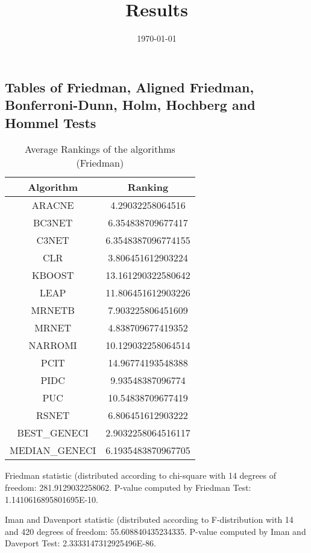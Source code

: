 \documentclass[a4paper,10pt]{article}
\title{Results}
\author{}
\date{\today}
\begin{document}
\begin{landscape}
\oddsidemargin 0in \topmargin 0in\maketitle
\section{Tables of Friedman, Aligned Friedman, Bonferroni-Dunn, Holm, Hochberg and Hommel Tests}
\begin{table}[!htp]
\centering
\caption{Average Rankings of the algorithms (Friedman)
}\begin{tabular}{c|c}
Algorithm&Ranking\\
\hline
ARACNE&4.29032258064516\\
BC3NET&6.354838709677417\\
C3NET&6.3548387096774155\\
CLR&3.806451612903224\\
KBOOST&13.161290322580642\\
LEAP&11.806451612903226\\
MRNETB&7.903225806451609\\
MRNET&4.838709677419352\\
NARROMI&10.129032258064514\\
PCIT&14.96774193548388\\
PIDC&9.93548387096774\\
PUC&10.54838709677419\\
RSNET&6.806451612903222\\
BEST_GENECI&2.9032258064516117\\
MEDIAN_GENECI&6.1935483870967705\\
\end{tabular}
\end{table}


Friedman statistic (distributed according to chi-square with 14 degrees of freedom: 281.9129032258062. 
P-value computed by Friedman Test: 1.1410616895801695E-10.\newline

Iman and Davenport statistic (distributed according to F-distribution with 14 and 420 degrees of freedom: 55.608840435234335. 
P-value computed by Iman and Daveport Test: 2.3333147312925496E-86.\newline


\newpage


\end{landscape}
\end{document}
